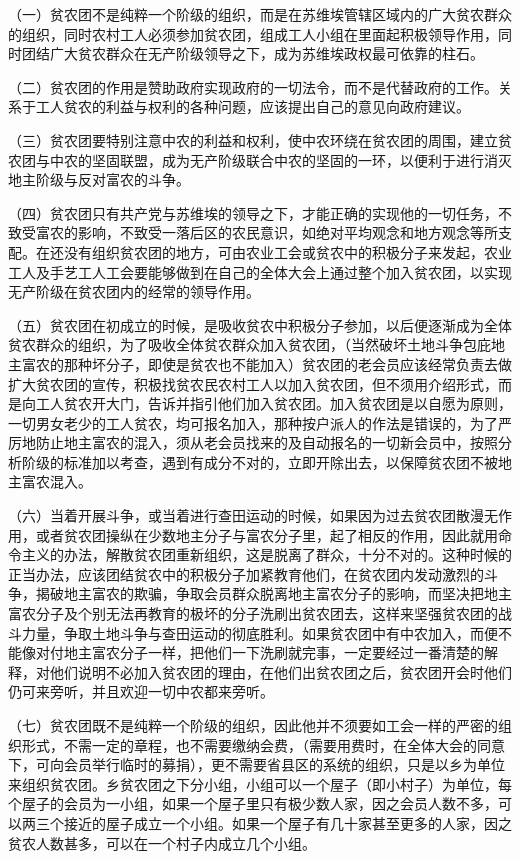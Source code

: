 （一）贫农团不是纯粹一个阶级的组织，而是在苏维埃管辖区域内的广大贫农群众的组织，同时农村工人必须参加贫农团，组成工人小组在里面起积极领导作用，同时团结广大贫农群众在无产阶级领导之下，成为苏维埃政权最可依靠的柱石。

（二）贫农团的作用是赞助政府实现政府的一切法令，而不是代替政府的工作。关系于工人贫农的利益与权利的各种问题，应该提出自己的意见向政府建议。

（三）贫农团要特别注意中农的利益和权利，使中农环绕在贫农团的周围，建立贫农团与中农的坚固联盟，成为无产阶级联合中农的坚固的一环，以便利于进行消灭地主阶级与反对富农的斗争。

（四）贫农团只有共产党与苏维埃的领导之下，才能正确的实现他的一切任务，不致受富农的影响，不致受一落后区的农民意识，如绝对平均观念和地方观念等所支配。在还没有组织贫农团的地方，可由农业工会或贫农中的积极分子来发起，农业工人及手艺工人工会要能够做到在自己的全体大会上通过整个加入贫农团，以实现无产阶级在贫农团内的经常的领导作用。

（五）贫农团在初成立的时候，是吸收贫农中积极分子参加，以后便逐渐成为全体贫农群众的组织，为了吸收全体贫农群众加入贫农团，（当然破坏土地斗争包庇地主富农的那种坏分子，即使是贫农也不能加入）贫农团的老会员应该经常负责去做扩大贫农团的宣传，积极找贫农民农村工人以加入贫农团，但不须用介绍形式，而是向工人贫农开大门，告诉并指引他们加入贫农团。加入贫农团是以自愿为原则，一切男女老少的工人贫农，均可报名加入，那种按户派人的作法是错误的，为了严厉地防止地主富农的混入，须从老会员找来的及自动报名的一切新会员中，按照分析阶级的标准加以考查，遇到有成分不对的，立即开除出去，以保障贫农团不被地主富农混入。

（六）当着开展斗争，或当着进行查田运动的时候，如果因为过去贫农团散漫无作用，或者贫农团操纵在少数地主分子与富农分子里，起了相反的作用，因此就用命令主义的办法，解散贫农团重新组织，这是脱离了群众，十分不对的。这种时候的正当办法，应该团结贫农中的积极分子加紧教育他们，在贫农团内发动激烈的斗争，揭破地主富农的欺骗，争取会员群众脱离地主富农分子的影响，而坚决把地主富农分子及个别无法再教育的极坏的分子洗刷出贫农团去，这样来坚强贫农团的战斗力量，争取土地斗争与查田运动的彻底胜利。如果贫农团中有中农加入，而便不能像对付地主富农分子一样，把他们一下洗刷就完事，一定要经过一番清楚的解释，对他们说明不必加入贫农团的理由，在他们出贫农团之后，贫农团开会时他们仍可来旁听，并且欢迎一切中农都来旁听。

（七）贫农团既不是纯粹一个阶级的组织，因此他并不须要如工会一样的严密的组织形式，不需一定的章程，也不需要缴纳会费，（需要用费时，在全体大会的同意下，可向会员举行临时的募捐），更不需要省县区的系统的组织，只是以乡为单位来组织贫农团。乡贫农团之下分小组，小组可以一个屋子（即小村子）为单位，每个屋子的会员为一小组，如果一个屋子里只有极少数人家，因之会员人数不多，可以两三个接近的屋子成立一个小组。如果一个屋子有几十家甚至更多的人家，因之贫农人数甚多，可以在一个村子内成立几个小组。

